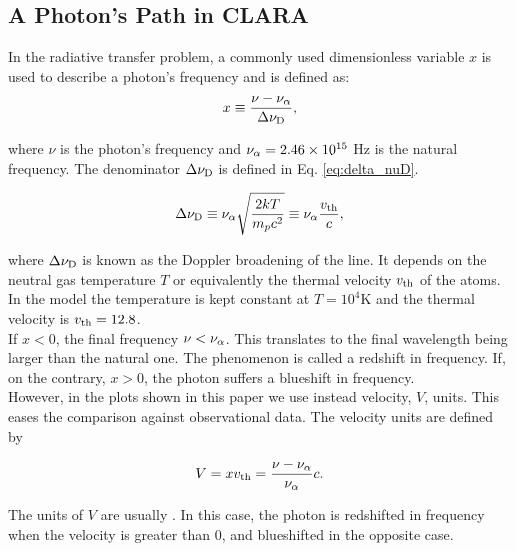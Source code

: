 \documentclass[twocolappendix]{latex/emulateapj}
\begin{document}
\subsection{A \lya Photon's Path in CLARA}
\label{subsec:photons_path_clara}

In the \lya radiative transfer problem, a commonly used dimensionless variable $x$ is used to describe a photon's frequency and is defined as:\\

\begin{equation}
	\label{eq:x_freq}
	x \equiv \frac{\nu -\nu_{\rm \alpha}}{\Delta\nu_{\rm D}},
\end{equation} 

where $\nu$ is the photon's frequency and $\nu_{\rm \alpha} = 2.46\times 10^{15}$ Hz is the \lya natural frequency. The denominator $\Delta\nu_{\rm D}$ is defined in Eq. \ref{eq:delta_nuD}.

\begin{equation}
	\label{eq:delta_nuD}
	\Delta\nu_{\rm D} \equiv \nu_{\rm \alpha}\sqrt{\frac{2kT}{m_pc^2}} \equiv \nu_{\rm \alpha} \frac{v_{\rm th}}{c},
\end{equation} 

where $\Delta\nu_{\rm D}$ is known as the Doppler broadening of the \lya line. It depends on the neutral gas temperature $T$ or equivalently the thermal velocity $v_{\rm th}$ of the atoms. In the model the temperature is kept constant at $T=10^4$K and the thermal velocity is $v_{\rm th}=12.8$\kms. \\

If $x < 0$, the final frequency $\nu < \nu_{\rm \alpha}$. This translates to the final wavelength being larger than the \lya natural one. The phenomenon is called a redshift in frequency. If, on the contrary, $x > 0$, the photon suffers a blueshift in frequency. \\

However, in the plots shown in this paper we use instead velocity, $V$, units. This eases the comparison against observational data. The velocity units are defined by

\begin{equation}
	\label{eq:V}
	V = xv_{\rm th} = \frac{\nu -\nu_{\rm \alpha}}{\nu_{\rm \alpha}}c.
\end{equation}

The units of $V$ are usually \kms. In this case, the photon is redshifted in frequency when the velocity is greater than 0, and blueshifted in the opposite case. \\
\end{document}
